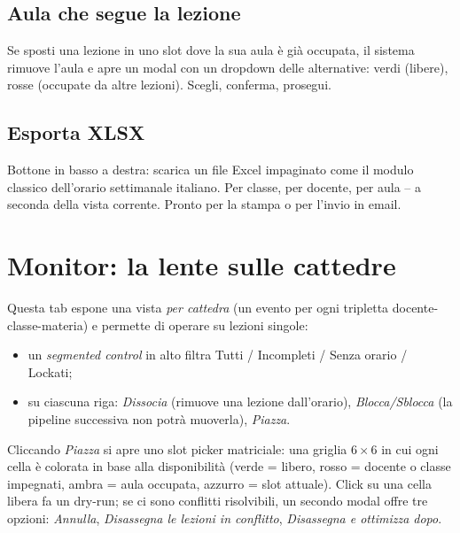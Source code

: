 \subsection{Aula che segue la lezione}

Se sposti una lezione in uno slot dove la sua aula \`e gi\`a
occupata, il sistema rimuove l'aula e apre un modal con un
dropdown delle alternative: verdi (libere), rosse (occupate da
altre lezioni). Scegli, conferma, prosegui.

\subsection{Esporta XLSX}

Bottone in basso a destra: scarica un file Excel impaginato come
il modulo classico dell'orario settimanale italiano. Per
classe, per docente, per aula -- a seconda della vista
corrente. Pronto per la stampa o per l'invio in email.


\section{Monitor: la lente sulle cattedre}
\label{sec:tab_monitor}

Questa tab espone una vista \emph{per cattedra} (un evento per
ogni tripletta docente-classe-materia) e permette di operare
su lezioni singole:

\begin{itemize}
\item un \emph{segmented control} in alto filtra Tutti /
  Incompleti / Senza orario / Lockati;
\item su ciascuna riga: \emph{Dissocia} (rimuove una lezione
  dall'orario), \emph{Blocca/Sblocca} (la pipeline successiva
  non potr\`a muoverla), \emph{Piazza}.
\end{itemize}

Cliccando \emph{Piazza} si apre uno slot picker matriciale: una
griglia $6\times 6$ in cui ogni cella \`e colorata in base alla
disponibilit\`a (verde = libero, rosso = docente o classe
impegnati, ambra = aula occupata, azzurro = slot attuale).
Click su una cella libera fa un dry-run; se ci sono conflitti
risolvibili, un secondo modal offre tre opzioni: \emph{Annulla},
\emph{Disassegna le lezioni in conflitto}, \emph{Disassegna e
ottimizza dopo}.

